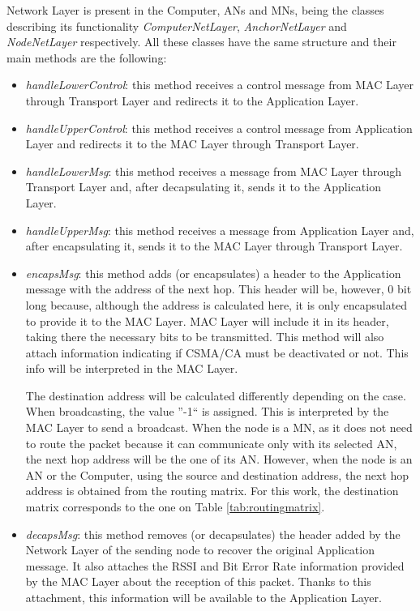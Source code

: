 Network Layer is present in the Computer, \acp{AN} and \acp{MN}, being the classes describing its functionality \textit{ComputerNetLayer},
\textit{AnchorNetLayer} and \textit{NodeNetLayer} respectively. All these classes have the same structure and their main methods are the following:
\begin{itemize}
 \item \textit{handleLowerControl}: this method receives a control message from \ac{MAC} Layer through Transport Layer and redirects it to the
Application Layer.

 \item \textit{handleUpperControl}: this method receives a control message from Application Layer and redirects it to the \ac{MAC} Layer through
Transport Layer.

 \item \textit{handleLowerMsg}: this method receives a message from \ac{MAC} Layer through Transport Layer and, after decapsulating it, sends it
to the Application Layer.

 \item \textit{handleUpperMsg}: this method receives a message from Application Layer and, after encapsulating it, sends it to the \ac{MAC}
Layer through Transport Layer.

 \item \textit{encapsMsg}: this method adds (or encapsulates) a header to the Application message with the address of the next hop. This 
header will be, however, 0 bit long because, although the address is calculated here, it is only encapsulated to provide it to the \ac{MAC} Layer.
\ac{MAC} Layer will include it in its header, taking there the necessary bits to be transmitted. This method will also attach information 
indicating if \ac{CSMA/CA} must be deactivated or not. This info will be interpreted in the \ac{MAC} Layer.

The destination address will be calculated differently depending on the case. When broadcasting, the value ''-1`` is assigned. This is 
interpreted by the \ac{MAC} Layer to send a broadcast. When the node is a \ac{MN}, as it does not need to route the packet because it 
can communicate only with its selected \ac{AN}, the next hop address will be the one of its \ac{AN}. However, when the node is an \ac{AN}
or the Computer, using the source and destination address, the next hop address is obtained from the routing matrix. For this work, the 
destination matrix corresponds to the one on Table \ref{tab:routingmatrix}.

 \item \textit{decapsMsg}: this method removes (or decapsulates) the header added by the Network Layer of the sending node to recover the 
original Application message. It also attaches the \ac{RSSI} and Bit Error Rate information provided by the \ac{MAC} Layer about the 
reception of this packet. Thanks to this attachment, this information will be available to the Application Layer.
\end{itemize}


